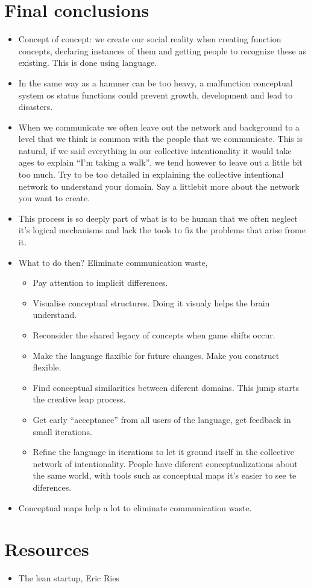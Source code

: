 \section{Final conclusions}
\begin{itemize}
    \item Concept of concept: we create our social reality when creating function concepts, declaring instances of them and getting people to recognize these as existing. This is done using language. 
    \item In the same way as a hammer can be too heavy, a malfunction conceptual system os status functions could prevent growth, development and lead to disasters. 
    \item When we communicate we often leave out the network and background to a level that we think is common with the people that we communicate. This is natural, if we said everything in our collective intentionality it would take ages to explain ``I'm taking a walk'', we tend however to leave out a little bit too much. Try to be too detailed in explaining the collective intentional network to understand your domain. Say a littlebit more about the network you want to create.
    \item This process is so deeply part of what is to be human that we often neglect it's logical mechanisms and lack the tools to fiz the problems that arise frome it.
    \item What to do then? Eliminate communication waste,
        \begin{itemize}
            \item Pay attention to implicit differences.
            \item Visualise conceptual structures. Doing it visualy helps the brain understand.
            \item Reconsider the shared legacy of concepts when game shifts occur.
            \item Make the language flaxible for future changes. Make you construct flexible. 
            \item Find conceptual similarities between diferent domains. This jump starts the creative leap process.
            \item Get early ``acceptance'' from all users of the language, get feedback in small iterations.
            \item Refine the language in iterations to let it ground itself in the collective network of intentionality. People have diferent conceptualizations about the same world, with tools such as conceptual maps it's easier to see te diferences.
        \end{itemize}
    \item Conceptual maps help a lot to eliminate communication waste.
\end{itemize}





\section{Resources}
\begin{itemize}
    \item The lean startup, Eric Ries
\end{itemize}
